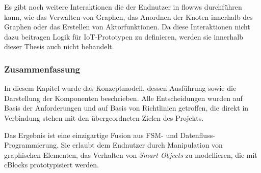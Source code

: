 Es gibt noch weitere Interaktionen die der Endnutzer in flowws durchführen kann, wie das Verwalten von Graphen, das Anordnen der Knoten innerhalb des Graphen oder das Erstellen von Aktorfunktionen. Da diese Interaktionen nicht dazu beitragen Logik für \ac{IoT}-Prototypen zu definieren, werden sie innerhalb dieser Thesis auch nicht behandelt.

\subsubsection*{Zusammenfassung}
In diesem Kapitel wurde das Konzeptmodell, dessen Ausführung sowie die Darstellung der Komponenten beschrieben. Alle Entscheidungen wurden auf Basis der Anforderungen und auf Basis von Richtlinien getroffen, die direkt in Verbindung stehen mit den übergeordneten Zielen des Projekts.

Das Ergebnis ist eine einzigartige Fusion aus \ac{FSM}- und Datenfluss-Programmierung. Sie erlaubt dem Endnutzer durch Manipulation von graphischen Elementen, das Verhalten von \textit{Smart Objects} zu modellieren, die mit \acp{cBlock} prototypisiert werden.
